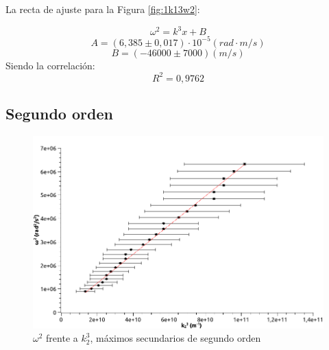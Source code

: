 \documentclass[a4paper,12pt,spanish]{article}
\begin{document}

La recta de ajuste para la Figura \ref{fig:1k13w2}:

\[ \omega^2 = k^3 x +B
\]
\[A = (6,385 \pm 0,017) \cdot 10^{-5} \si{(rad\cdot m/s)}  %
\]
\[ B = (-46000\pm 7000)\si{(m/s)}
\]
Siendo la correlación:
\[ R^2 =  0,9762
\]

\subsection*{Segundo orden}

\begin{figure}[H]
	\centering
	\includegraphics[width=0.9\linewidth]{../fotos/graficas/1_k23w2}
	\caption{$\omega^2$ frente a $k_2^3$, máximos secundarios de segundo orden}
	\label{fig:1k23w2}
\end{figure}
\end{document}
